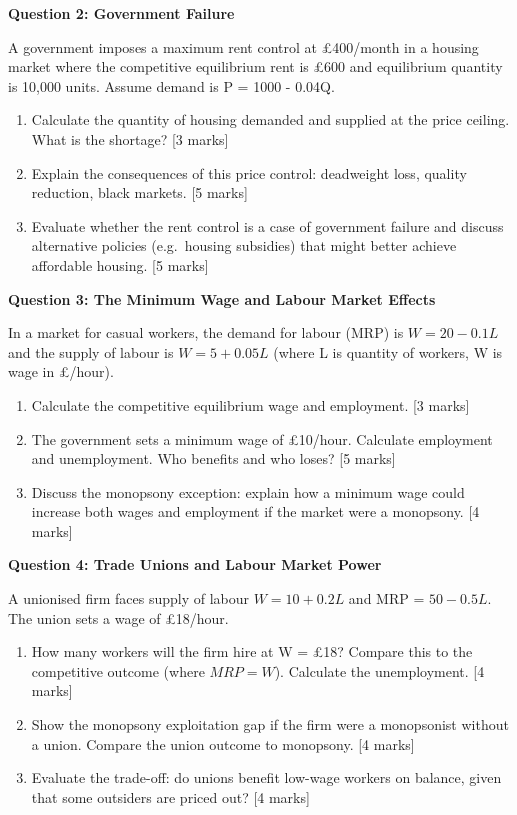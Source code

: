 \documentclass[11pt, a4paper, twoside]{book}
\begin{document}
\begin{exampractice}
\textbf{Question 2: Government Failure}

A government imposes a maximum rent control at £400/month in a housing market where the competitive equilibrium rent is £600 and equilibrium quantity is 10,000 units. Assume demand is P = 1000 - 0.04Q.

\begin{enumerate}[label=(\alph*)]
\item Calculate the quantity of housing demanded and supplied at the price ceiling. What is the shortage? [3 marks]
\item Explain the consequences of this price control: deadweight loss, quality reduction, black markets. [5 marks]
\item Evaluate whether the rent control is a case of government failure and discuss alternative policies (e.g.\ housing subsidies) that might better achieve affordable housing. [5 marks]
\end{enumerate}
\end{exampractice}

\begin{exampractice}
\textbf{Question 3: The Minimum Wage and Labour Market Effects}

In a market for casual workers, the demand for labour (MRP) is $W = 20 - 0.1L$ and the supply of labour is $W = 5 + 0.05L$ (where L is quantity of workers, W is wage in £/hour).

\begin{enumerate}[label=(\alph*)]
\item Calculate the competitive equilibrium wage and employment. [3 marks]
\item The government sets a minimum wage of £10/hour. Calculate employment and unemployment. Who benefits and who loses? [5 marks]
\item Discuss the monopsony exception: explain how a minimum wage could increase both wages and employment if the market were a monopsony. [4 marks]
\end{enumerate}
\end{exampractice}

\begin{exampractice}
\textbf{Question 4: Trade Unions and Labour Market Power}

A unionised firm faces supply of labour $W = 10 + 0.2L$ and MRP = $50 - 0.5L$. The union sets a wage of £18/hour.

\begin{enumerate}[label=(\alph*)]
\item How many workers will the firm hire at W = £18? Compare this to the competitive outcome (where $MRP = W$). Calculate the unemployment. [4 marks]
\item Show the monopsony exploitation gap if the firm were a monopsonist without a union. Compare the union outcome to monopsony. [4 marks]
\item Evaluate the trade-off: do unions benefit low-wage workers on balance, given that some outsiders are priced out? [4 marks]
\end{enumerate}
\end{exampractice}
\end{document}
